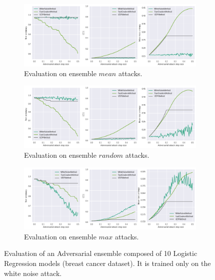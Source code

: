\begin{figure}[htbp]
    \begin{subfigure}{\textwidth}
      \centering
      \includegraphics[width=\linewidth]{figures/eval/eval_adv_uq_train_ensemble_noise_mean.png}
      \caption{Evaluation on ensemble $mean$ attacks.}
    \end{subfigure}
     \begin{subfigure}{\textwidth}
      \centering
      \includegraphics[width=\linewidth]{figures/eval/eval_adv_uq_train_ensemble_noise_random.png}
      \caption{Evaluation on ensemble $random$ attacks.}
    \end{subfigure}
    \begin{subfigure}{\textwidth}
      \centering
      \includegraphics[width=\linewidth]{figures/eval/eval_adv_uq_train_ensemble_noise_max.png}
      \caption{Evaluation on ensemble $max$ attacks.}
    \end{subfigure}
    \caption{Evaluation of an Adversarial ensemble composed of 10 Logistic Regression models (breast cancer dataset). It is trained only on the white noise attack.}
    \label{fig:adversarial-evaluation-training-ensemble-noise}
\end{figure}

